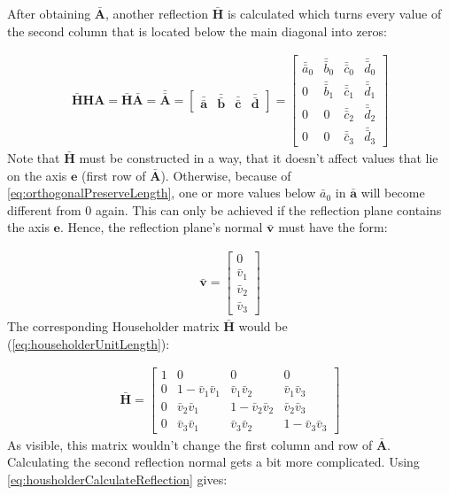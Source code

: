 After obtaining $\mathbf{\bar{A}}$, another reflection $\mathbf{\bar{H}}$ is calculated which turns every value of the second column that is located below the main diagonal into zeros:

\begin{align}
\mathbf{\bar{H}}\mathbf{H}\mathbf{A} 
= 
\mathbf{\bar{H}}\mathbf{\bar{A}}
= 
\mathbf{\bar{\bar{A}}}
=
\begin{bmatrix}
\mathbf{\bar{\bar{a}}}&\mathbf{\bar{\bar{b}}}&\mathbf{\bar{\bar{c}}}&\mathbf{\bar{\bar{d}}}
\end{bmatrix}	
=
\begin{bmatrix}
\bar{\bar{a}}_0&\bar{\bar{b}}_0&\bar{\bar{c}}_0&\bar{\bar{d}}_0\\
0              &\bar{\bar{b}}_1&\bar{\bar{c}}_1&\bar{\bar{d}}_1\\
0              &0              &\bar{\bar{c}}_2&\bar{\bar{d}}_2\\
0              &0              &\bar{\bar{c}}_3&\bar{\bar{d}}_3
\end{bmatrix}					  
\end{align}
%
Note that $\mathbf{\bar{H}}$ must be constructed in a way, that it doesn't affect values that lie on the axis $\mathbf{e}$ (first row of $\mathbf{\bar{A}}$).
Otherwise, because of \cref{eq:orthogonalPreserveLength}, one or more values below $\bar{a}_0$ in $\mathbf{\bar{a}}$ will become different from 0 again.
This can only be achieved if the reflection plane contains the axis $\mathbf{e}$.
Hence, the reflection plane's normal $\mathbf{\bar{v}}$ must have the form: 

\begin{align}
\label{eq:qrReflectionVector1Requirement}
\mathbf{\bar{v}}
= 
\begin{bmatrix}
0\\
\bar{v}_1\\
\bar{v}_2\\
\bar{v}_3
\end{bmatrix}
\end{align}
%
The corresponding Householder matrix $\mathbf{\bar{H}}$ would be (\cref{eq:householderUnitLength}):

\begin{align}
\mathbf{\bar{H}}
=
\begin{bmatrix}
1    &0                   &0                   &0                   \\
0    &1-\bar{v}_1\bar{v}_1&  \bar{v}_1\bar{v}_2&  \bar{v}_1\bar{v}_3\\
0    &  \bar{v}_2\bar{v}_1&1-\bar{v}_2\bar{v}_2&  \bar{v}_2\bar{v}_3\\
0    &  \bar{v}_3\bar{v}_1&  \bar{v}_3\bar{v}_2&1-\bar{v}_3\bar{v}_3
\end{bmatrix}					  
\end{align}
%
As visible, this matrix wouldn't change the first column and row of $\mathbf{\bar{A}}$.
Calculating the second reflection normal gets a bit more complicated.
Using \cref{eq:housholderCalculateReflection} gives:

